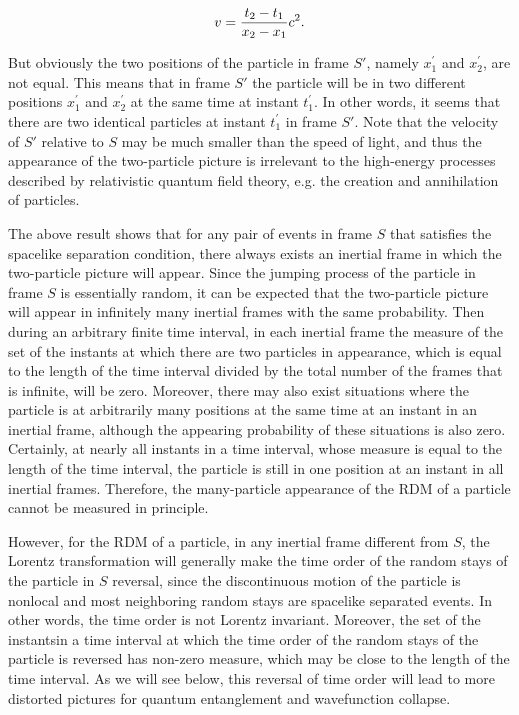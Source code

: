 \begin{equation}
v={ {t_2-t_1} \over {x_2-x_1}}c^2.
\label{}
\end{equation}

\noindent But obviously the two positions of the particle in frame $S'$, namely $x_1^{'}$ and $x_2^{'}$, are not equal. This means that in frame $S'$ the particle will be in two different positions $x_1^{'}$ and $x_2^{'}$ at the same time at instant $t_1^{'}$. In other words, it seems that there are two identical particles at instant $t_1^{'}$ in frame $S'$. Note that the velocity of $S'$ relative to $S$ may be much smaller than the speed of light, and thus the appearance of the two-particle picture is irrelevant to the high-energy processes described by relativistic quantum field theory, e.g. the creation and annihilation of particles. 

The above result shows that for any pair of events in frame $S$ that satisfies the spacelike separation condition, there always exists an inertial frame in which the two-particle picture will appear. Since the jumping process of the particle in frame $S$ is essentially random, it can be expected that the two-particle picture will appear in infinitely many inertial frames with the same probability. Then during an arbitrary finite time interval, in each inertial frame the measure of the set of the instants at which there are two particles in appearance, which is equal to the length of the time interval divided by the total number of the frames that is infinite, will be zero. Moreover, there may also exist situations where the particle is at arbitrarily many positions at the same time at an instant in an inertial frame, although the appearing probability of these situations is also zero. Certainly, at nearly all instants in a time interval, whose measure is equal to the length of the time interval, the particle is still in one position at an instant in all inertial frames. Therefore, the many-particle appearance of the RDM of a particle cannot be measured in principle.

However, for the RDM of a particle, in any inertial frame different from $S$, the Lorentz transformation will generally make the time order of the random stays of the particle in $S$ reversal, since the discontinuous motion of the particle is nonlocal and most neighboring random stays are spacelike separated events. In other words, the time order is not Lorentz invariant. Moreover, the set of the instantsin a time interval  at which the time order of the random stays of the particle is reversed has non-zero measure, which may be close to the length of the time interval. As we will see below, this reversal of time order will lead to more distorted pictures for quantum entanglement and wavefunction collapse.

